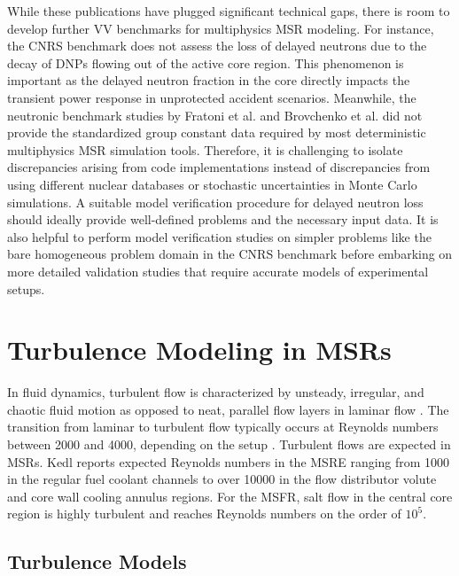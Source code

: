 While these publications have plugged significant technical gaps, there is room to develop further
\gls{VV} benchmarks for multiphysics \gls{MSR} modeling. For instance, the
CNRS benchmark does not assess the loss of delayed neutrons due to the decay of \glspl{DNP} flowing
out of the active core region. This phenomenon is important as the delayed neutron fraction in the
core directly impacts the transient power response in unprotected accident scenarios. Meanwhile,
the neutronic benchmark studies by Fratoni et al. \cite{fratoni_molten_2020} and Brovchenko et al.
\cite{brovchenko_neutronic_2019} did not provide the standardized group constant data required by
most deterministic multiphysics \gls{MSR} simulation tools. Therefore, it is challenging to isolate
discrepancies arising from code implementations instead of discrepancies from using different
nuclear databases or stochastic uncertainties in Monte Carlo simulations. A suitable model
verification procedure for delayed neutron loss should ideally provide well-defined problems and
the necessary input data. It is also helpful to perform model verification studies on simpler
problems like the bare homogeneous problem domain in the CNRS benchmark before embarking on more
detailed validation studies that require accurate models of experimental setups.

\section{Turbulence Modeling in MSRs}

In fluid dynamics, turbulent flow is characterized by unsteady, irregular, and
chaotic fluid motion as opposed to neat, parallel flow layers in laminar flow
\cite{pope_turbulent_2000}. The transition from laminar to turbulent flow
typically occurs at Reynolds numbers between 2000 and 4000, depending on the
setup \cite{pope_turbulent_2000}. Turbulent flows are expected in \glspl{MSR}.
Kedl \cite{kedl_fluid_1970} reports expected Reynolds numbers in the \gls{MSRE}
ranging from 1000 in the regular fuel coolant channels to over 10000 in the
flow distributor volute and core wall cooling annulus regions. For the
\gls{MSFR}, salt flow in the central core region is highly turbulent and
reaches Reynolds numbers on the order of $10^5$.

\subsection{Turbulence Models}

